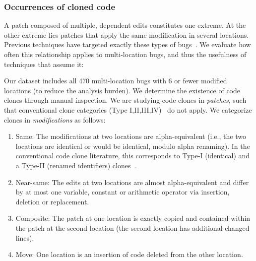 \documentclass[10pt,journal,compsoc]{IEEEtran}
\begin{document}
\subsubsection{Occurrences of cloned code}

A patch composed of multiple, dependent edits constitutes one
extreme. At the other extreme lies patches that apply the same modification in several locations. 
Previous techniques have targeted exactly these types of
bugs~\cite{wang2018,saha2019harnessing}.  We evaluate how often this relationship applies to
multi-location bugs, and thus the usefulness of techniques that assume it:



Our dataset includes all 470 multi-location bugs with 6 or fewer modified
locations (to reduce the analysis burden). We determine the existence of code 
clones through manual inspection.
%
%
%
We are studying code clones in \emph{patches}, such that conventional clone categories (Type I,II,III,IV)~\cite{convcodeclone} do not apply. We categorize clones in \emph{modifications} as follows:
\begin{enumerate}
\item Same: The modifications at two locations are alpha-equivalent (i.e., the two locations are identical or would be
identical, modulo alpha renaming). In the conventional code clone literature,
this corresponds to Type-I (identical) and a Type-II (renamed identifiers) clones~\cite{JiaClones}.
\item Near-same: The edits at two locations are almost alpha-equivalent and
  differ by at most one variable, constant or arithmetic operator via insertion, deletion or replacement.
\item Composite: The patch at one location is exactly copied and contained within the patch at 
the 
second location (the second location  has additional changed lines).
\item Move: One location is an insertion of 
code deleted from the other location. 
\end{enumerate}
\end{document}
